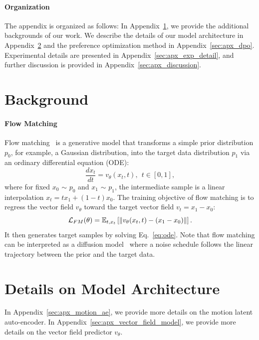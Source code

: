 \maketitlesupplementary
\appendix 
\paragraph{Organization} The appendix is organized as follows: In Appendix~\ref{sec:apx_background}, we provide the additional backgrounds of our work. We describe the details of our model architecture in Appendix~\ref{sec:apx_architecture} and the preference optimization method in Appendix~\ref{sec:apx_dpo}. Experimental details are presented in Appendix~\ref{sec:apx_exp_detail}, and further discussion is provided in Appendix~\ref{sec:apx_discussion}.

\section{Background}\label{sec:apx_background}
\paragraph{Flow Matching} Flow matching~\citep{cfm, rectflow} is a generative model that transforms a simple prior distribution $p_0$, for example, a Gaussian distribution, into the target data distribution $p_1$ via an ordinary differential equation (ODE):
\begin{equation}
    \frac{d x_t}{dt} = v_{\theta}(x_t, t), ~~ t \in [0, 1], \label{eq:ode}
\end{equation}
where for fixed $x_0$ $\sim$ $p_0$ and $x_1$ $\sim$ $p_1$, the intermediate sample is a linear interpolation $x_t = tx_1 + (1-t) x_0$. The training objective of flow matching is to regress the vector field $v_{\theta}$ toward the target vector field $v_t = x_1 - x_0$:
\begin{equation}
    \mathcal{L}_{FM}(\theta) = \mathbb{E}_{t, x_t} \left[\| v_{\theta}(x_t, t) - (x_1 - x_0)\|\right]. \label{eq:train_fm}
\end{equation}
It then generates target samples by solving Eq.~\eqref{eq:ode}. Note that flow matching can be interpreted as a diffusion model~\citep{ddpm, sde} where a noise schedule follows the linear trajectory between the prior and the target data.

\section{Details on Model Architecture}\label{sec:apx_architecture}
In Appendix~\ref{sec:apx_motion_ae}, we provide more details on the motion latent auto-encoder. In Appendix~\ref{sec:apx_vector_field_model}, we provide more details on the vector field predictor $v_\theta$.

